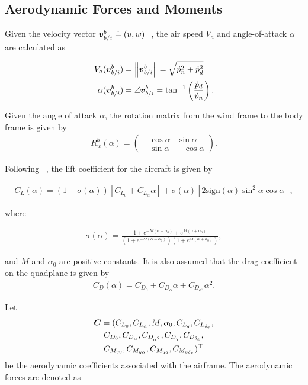 \subsection{Aerodynamic Forces and Moments}

Given the velocity vector $\boldsymbol{v}_{b/i}^b\doteq (u, w)^\top$, the air speed $V_a$ and angle-of-attack $\alpha$ are calculated as

\begin{align}
  V_a(\boldsymbol{v}_{b/i}^b) &= \left\|\boldsymbol{v}_{b/i}^b\right\| = \sqrt{\dot{p}_n^2+\dot{p}_d^2} \\
  \alpha(\boldsymbol{v}_{b/i}^b)  &= \angle{\boldsymbol{v}_{b/i}^b} =\tan^{-1}\left(\frac{\dot{p}_d}{\dot{p}_n}\right)
  .
\end{align}

Given the angle of attack $\alpha$, the rotation matrix from the wind frame to the body frame is given by
\begin{align}
    R_w^b(\alpha) = 
    \begin{pmatrix}
        -\cos\alpha & \sin\alpha \\ 
        -\sin\alpha & -\cos\alpha
    \end{pmatrix}
    .
  \end{align}

Following ~\cite{uav_book}, the lift coefficient for the aircraft is given by

\begin{align}
    C_L(\alpha) = \left(1-\sigma(\alpha)\right) \left[C_{L_0} + C_{L_{\alpha}}\alpha \right] + \sigma(\alpha) \left[2\text{sign}(\alpha)\sin^2\alpha\cos\alpha \right],
\end{align}

where

\begin{align}
    \sigma(\alpha) =  \frac{1+e^{-M(\alpha-\alpha_0)}+e^{M(\alpha+\alpha_0)}}{\left(1+e^{-M(\alpha-\alpha_0)}\right)\left(1+e^{M(\alpha+\alpha_0)}\right)} ,
\end{align}

and $M$ and $\alpha_0$ are positive constants.
It is also assumed that the drag coefficient on the quadplane is given by
\begin{align}
    C_D(\alpha) = C_{D_0} + C_{D_\alpha}\alpha + C_{D_{\alpha^2}}\alpha^2.
\end{align}

Let
\begin{multline}
\boldsymbol{C} = (C_{L_0}, C_{L_{\alpha}}, M, \alpha_0, C_{L_q}, C_{L_{\delta_e}}, \\
    C_{D_0}, C_{D_\alpha}, C_{D_{\alpha^2}}, C_{D_q}, C_{D_{\delta_e}}, \\
    C_{M_{y0}}, C_{M_{y\alpha}}, C_{M_{yq}}, C_{M_{y\delta_e}}
    )^\top
\end{multline}
be the aerodynamic coefficients associated with the airframe. The aerodynamic forces are denoted as

